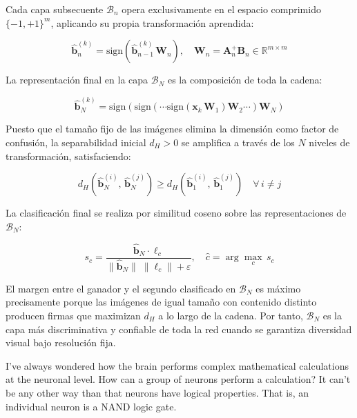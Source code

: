 \documentclass[12pt]{article}
\begin{document}
Cada capa subsecuente $\mathcal{B}_n$ opera exclusivamente en el espacio comprimido
$\{-1,+1\}^m$, aplicando su propia transformación aprendida:

\begin{equation}
	\hat{\mathbf{b}}_n^{(k)} = \text{sign}\!\left(\hat{\mathbf{b}}_{n-1}^{(k)} \, \mathbf{W}_n\right),
	\quad \mathbf{W}_n = \mathbf{A}_n^{+} \mathbf{B}_n \in \mathbb{R}^{m \times m}
\end{equation}

La representación final en la capa $\mathcal{B}_N$ es la composición de toda la cadena:

\begin{equation}
	\hat{\mathbf{b}}_N^{(k)} = \text{sign}\!\left(
	\text{sign}\!\left( \cdots
	\text{sign}\!\left(\mathbf{x}_k \, \mathbf{W}_1\right)
	\mathbf{W}_2 \cdots \right)
	\mathbf{W}_N \right)
\end{equation}

Puesto que el tamaño fijo de las imágenes elimina la dimensión como factor de confusión,
la separabilidad inicial $d_H > 0$ se amplifica a través de los $N$ niveles de transformación,
satisfaciendo:

\begin{equation}
	d_H\!\left(\hat{\mathbf{b}}_N^{(i)},\, \hat{\mathbf{b}}_N^{(j)}\right)
	\geq d_H\!\left(\hat{\mathbf{b}}_1^{(i)},\, \hat{\mathbf{b}}_1^{(j)}\right)
	\quad \forall\, i \neq j
\end{equation}

La clasificación final se realiza por similitud coseno sobre las representaciones de $\mathcal{B}_N$:

\begin{equation}
	s_c = \frac{\hat{\mathbf{b}}_N \cdot \boldsymbol{\ell}_c}
	{\|\hat{\mathbf{b}}_N\| \; \|\boldsymbol{\ell}_c\| + \varepsilon},
	\quad \hat{c} = \arg\max_{c}\, s_c
\end{equation}

El margen entre el ganador y el segundo clasificado en $\mathcal{B}_N$ es máximo precisamente
porque las imágenes de igual tamaño con contenido distinto producen firmas que maximizan
$d_H$ a lo largo de la cadena. Por tanto, $\mathcal{B}_N$ es la capa más discriminativa
y confiable de toda la red cuando se garantiza diversidad visual bajo resolución fija.





I've always wondered how the brain performs complex mathematical calculations at the neuronal level. How can a group of neurons perform a calculation? It can't be any other way than that neurons have logical properties. That is, an individual neuron is a NAND logic gate.
\end{document}
